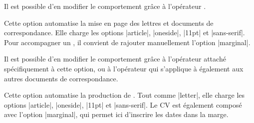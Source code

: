 \begin{developer}
Il est possible d'en modifier le comportement grâce à l'opérateur .
\end{developer}

\begin{noprint}
\end{noprint}

Cette option automatise la mise en page des lettres et documents de correspondance. Elle charge les options |article|, |oneside|, |11pt| et |sans-serif|. Pour accompagner un , il convient de rajouter manuellement l'option |marginal|.

\begin{developer}
Il est possible d'en modifier le comportement grâce à l'opérateur  attaché spécifiquement à cette option, ou à l'opérateur  qui s'applique à également aux autres documents de correspondance.
\end{developer}

\begin{noprint}
\end{noprint}

Cette option automatise la production de . Tout comme |letter|, elle charge les options |article|, |oneside|, |11pt| et |sans-serif|. Le CV est également composé avec l'option |marginal|, qui permet ici d'inscrire les dates dans la marge.

